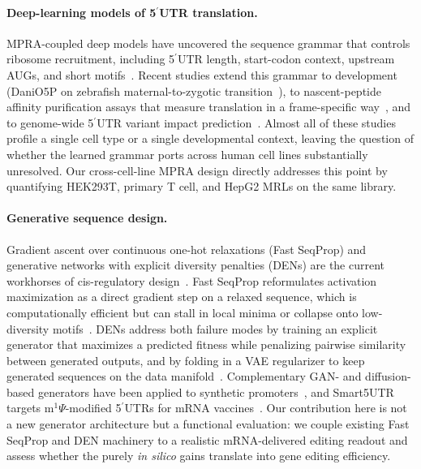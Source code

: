 \documentclass[11pt]{article}
\begin{document}
\paragraph{Deep-learning models of 5$^\prime$UTR translation.}
MPRA-coupled deep models have uncovered the sequence grammar that
controls ribosome recruitment, including 5$^\prime$UTR length,
start-codon context, upstream AUGs, and short
motifs~\citep{reimaopinto2025danio5p,strayer2024naptrap,
chaldebas2026utrvariants}. Recent studies extend this grammar to
development (DaniO5P on zebrafish maternal-to-zygotic
transition~\citep{reimaopinto2025danio5p}), to nascent-peptide
affinity purification assays that measure translation in a
frame-specific way~\citep{strayer2024naptrap}, and to genome-wide
5$^\prime$UTR variant impact prediction~\citep{chaldebas2026utrvariants}.
Almost all of these studies profile a single cell type or a single
developmental context, leaving the question of whether the learned
grammar ports across human cell lines substantially unresolved.
Our cross-cell-line MPRA design directly addresses this point by
quantifying HEK293T, primary T cell, and HepG2 MRLs on the same
library.

\paragraph{Generative sequence design.}
Gradient ascent over continuous one-hot relaxations
(Fast SeqProp) and generative networks with explicit diversity
penalties (DENs) are the current workhorses of cis-regulatory
design~\citep{linder2020den,linder2021fastseqprop}. Fast SeqProp
reformulates activation maximization as a direct gradient step on a
relaxed sequence, which is computationally efficient but can stall in
local minima or collapse onto low-diversity
motifs~\citep{linder2021fastseqprop}. DENs address both failure modes
by training an explicit generator that maximizes a predicted fitness
while penalizing pairwise similarity between generated outputs, and
by folding in a VAE regularizer to keep generated sequences on the
data manifold~\citep{linder2020den}. Complementary GAN- and
diffusion-based generators have been applied to synthetic
promoters~\citep{zhao2024promotergan,lei2025promoterdiffusion}, and
Smart5UTR targets m$^{1}\Psi$-modified 5$^\prime$UTRs for mRNA
vaccines~\citep{tang2023smart5utr}. Our contribution here is not a
new generator architecture but a functional evaluation: we couple
existing Fast SeqProp and DEN machinery to a realistic mRNA-delivered
editing readout and assess whether the purely \emph{in silico} gains
translate into gene editing efficiency.
\end{document}
